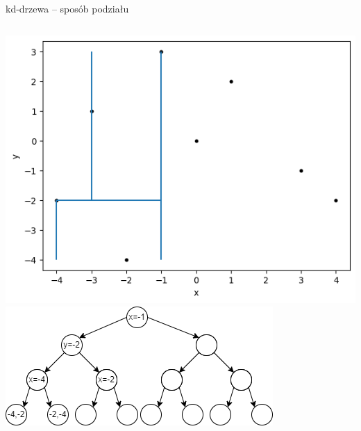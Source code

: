 \documentclass[aspectratio=169,dvipsnames]{beamer}
\begin{document}
\begin{frame}{kd-drzewa -- sposób podziału}
    \begin{columns}
        \includegraphics[width=\textwidth]{images/plots/5}
        \includegraphics[width=\textwidth]{images/trees/6.drawio}
    \end{columns}
\end{frame}
\end{document}
